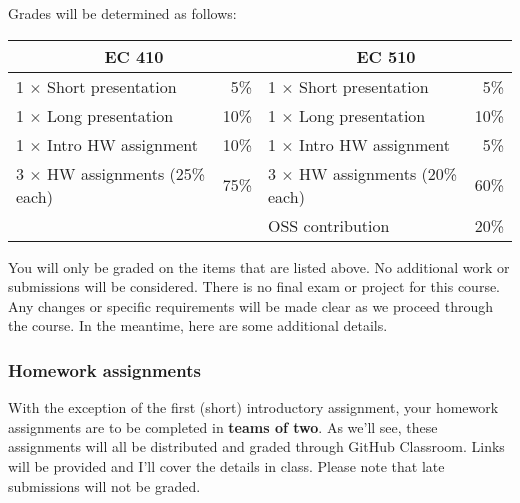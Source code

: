 \documentclass[12]{article}
\begin{document}

Grades will be determined as follows:

\begin{table}[!h] \centering 
	\label{tab:grades} 
	\begin{tabularx}{0.9\textwidth}{Xr|Xr} 
		\toprule
		\multicolumn{2}{c}{EC 410}	& \multicolumn{2}{c}{EC 510}  \\
		\midrule
		1 $\times$ Short presentation  			&	 5\%	& 1 $\times$ Short presentation			& 5\% \\
		1 $\times$ Long presentation  			&	 10\%	& 1 $\times$ Long presentation			& 10\% \\
		1 $\times$ Intro HW assignment			&	 10\%	& 1 $\times$ Intro HW assignment		& 5\% \\
		3 $\times$ HW assignments (25\% each)	&	 75\%	& 3 $\times$ HW assignments (20\% each)	& 60\% \\
												& 			& OSS contribution						& 20\% \\
		\bottomrule
	\end{tabularx} 
\end{table} 

You will only be graded on the items that are listed above. No additional work
or submissions will be considered. There is no final exam or project for this
course. Any changes or specific requirements will be made clear as we proceed
through the course. In the meantime, here are some additional details.

\vspace{-0.25cm}
\subsubsection*{Homework assignments}

With the exception of the first (short) introductory assignment, your homework
assignments are to be completed in \textbf{teams of two}. As we'll see, these
assignments will all be distributed and graded through GitHub Classroom. Links
will be provided and I'll cover the details in class. Please note that late
submissions will not be graded. \vspace{-0.25cm}
\end{document}
